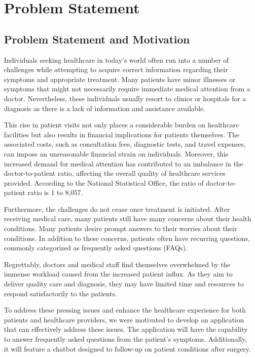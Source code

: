\documentclass[12pt,oneside,openright,a4paper]{cpe-english-project}
\begin{document}
  \section{Problem Statement}
    \subsection{Problem Statement and Motivation}
      \qquad Individuals seeking healthcare in today's world often run into a number of challenges while attempting to acquire correct information regarding their symptoms and appropriate treatment. Many patients have minor illnesses or symptoms that might not necessarily require immediate medical attention from a doctor. Nevertheless, these individuals usually resort to clinics or hospitals for a diagnosis as there is a lack of information and assistance available. \par
      \qquad This rise in patient visits not only places a considerable burden on healthcare facilities but also results in financial implications for patients themselves. The associated costs, such as consultation fees, diagnostic tests, and travel expenses, can impose an unreasonable financial strain on individuals. Moreover, this increased demand for medical attention has contributed to an imbalance in the doctor-to-patient ratio, affecting the overall quality of healthcare services provided. According to the National Statistical Office, the ratio of doctor-to-patient ratio is 1 to 8,057\cite{NSODashboard}.\par
      \qquad Furthermore, the challenges do not cease once treatment is initiated. After receiving medical care, many patients still have many concerns about their health conditions. Many patients desire prompt answers to their worries about their conditions. In addition to these concerns, patients often have recurring questions, commonly categorized as frequently asked questions (FAQs).\par
      \qquad Regrettably, doctors and medical staff find themselves overwhelmed by the immense workload caused from the increased patient influx. As they aim to deliver quality care and diagnosis, they may have limited time and resources to respond satisfactorily to the patients.\par
      \qquad To address these pressing issues and enhance the healthcare experience for both patients and healthcare providers, we were motivated to develop an application that can effectively address these issues. The application will have the capability to answer frequently asked questions from the patient's symptoms. Additionally, it will feature a chatbot designed to follow-up on patient conditions after surgery.\par
\end{document}
